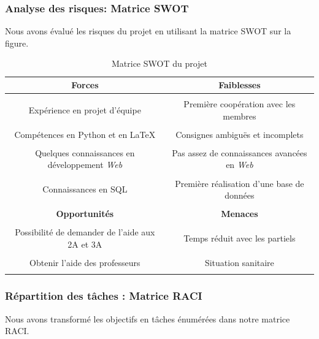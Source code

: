 \documentclass[12pt]{article}
\begin{document}
\subsubsection{Analyse des risques: Matrice SWOT}
    Nous avons évalué les risques du projet en utilisant la matrice SWOT sur la figure.
    \begin{table}[!h]
        \centering
        \begin{tabular}{|c|c|}
            \hline
            \textbf{Forces} & \textbf{Faiblesses} \\
            \hline
            \hline
                    & \\
            Expérience en projet d'équipe & Première coopération avec les membres \\ 
                    & \\
            Compétences en Python et en \LaTeX & Consignes ambiguës et incomplets \\
                    & \\
            Quelques connaissances en développement \textsl{Web} & Pas assez de connaissances avancées en \textsl{Web}  \\
                    & \\
            Connaissances en \textsf{SQL} & Première réalisation d'une base de données \\
                    & \\
            \hline
            \hline
            \textbf{Opportunités} & \textbf{Menaces} \\
            \hline
            \hline
             & \\
            Possibilité de demander de l'aide aux 2A et 3A & Temps réduit avec les partiels \\
             & \\
            Obtenir l'aide des professeurs & Situation sanitaire \\
             & \\
            \hline
        \end{tabular}
        \caption{Matrice SWOT du projet}
        \label{tab:swot}
    \end{table}

\newpage
\subsubsection{Répartition des tâches : Matrice RACI}

     Nous avons transformé les objectifs en tâches énumérées dans notre matrice RACI. \\
\end{document}
